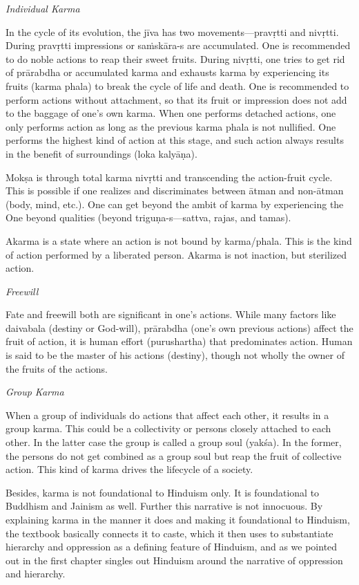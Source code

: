 \noindent
\textit{Individual Karma} 

In the cycle of its evolution, the jīva has two movements—pravṛtti and nivṛtti. During pravṛtti impressions or saṁskāra-s are accumulated. One is recommended to do noble actions to reap their sweet fruits. During nivṛtti, one tries to get rid of prārabdha or accumulated karma and exhausts karma by experiencing its fruits (karma phala) to break the cycle of life and death. One is recommended to perform actions without attachment, so that its fruit or impression does not add to the baggage of one's own karma. When one performs detached actions, one only performs action as long as the previous karma phala is not nullified. One performs the highest kind of action at this stage, and such action always results in the benefit of surroundings (loka kalyāṇa). 

Mokṣa is through total karma nivṛtti and transcending the action-fruit cycle. This is possible if one realizes and discriminates between ātman and non-ātman (body, mind, etc.). One can get beyond the ambit of karma by experiencing the One beyond qualities (beyond triguṇa-s—sattva, rajas, and tamas).

Akarma is a state where an action is not bound by karma/phala. This is the kind of action performed by a liberated person. Akarma is not inaction, but sterilized action.

\noindent
\textit{Freewill} 

Fate and freewill both are significant in one's actions. While many factors like daivabala (destiny or God-will), prārabdha (one's own previous actions) affect the fruit of action, it is human effort (purushartha) that predominates action. Human is said to be the master of his actions (destiny), though not wholly the owner of the fruits of the actions.

\noindent
\textit{Group Karma} 

When a group of individuals do actions that affect each other, it results in a group karma. This could be a collectivity or persons closely attached to each other. In the latter case the group is called a group soul (yakśa). In the former, the persons do not get combined as a group soul but reap the fruit of collective action. This kind of karma drives the lifecycle of a society.

Besides, karma is not foundational to Hinduism only. It is foundational to Buddhism and Jainism as well. Further this narrative is not innocuous. By explaining karma in the manner it does and making it foundational to Hinduism, the textbook basically connects it to caste, which it then uses to substantiate hierarchy and oppression as a defining feature of Hinduism, and as we pointed out in the first chapter singles out Hinduism around the narrative of oppression and hierarchy.

